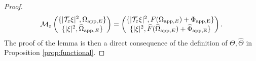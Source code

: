 \documentclass[11pt,reqno,a4paper]{amsart}
\def\eps{\varepsilon}
\newcommand{\cM}{\mathcal{M}}
\newcommand{\cT}{\mathcal{T}}
\newcommand{\app}{\mathrm{app}}
\newcommand{\1}{\mathbbm{1}}
\theoremstyle{definition}
\theoremstyle{definition}
\numberwithin{equation}{section}
\begin{document}
\begin{proof}
        \begin{align}
\cM_{\eps}\begin{pmatrix}
        \{|\cT_{\eps} \xi|^2,\Omega_{\app,E}\}\\
        \{|\xi|^2,\widehat{\Omega}_{\app,E}\}
\end{pmatrix}=\begin{pmatrix}
        \{|\cT_{\eps} \xi|^2,F(\Omega_{\app,E})+\Phi_{\rm app,E}\}\\
        \{|\xi|^2,\widehat{F}(\widehat{\Omega}_{\app,E})+\widehat{\Phi}_{\rm app,E}\}
\end{pmatrix}.
        \end{align}
        The proof of the lemma is then a direct consequence of the definition of $\Theta,\widehat{\Theta}$ in Proposition \ref{prop:functional}.
    \end{proof}
\end{document}
